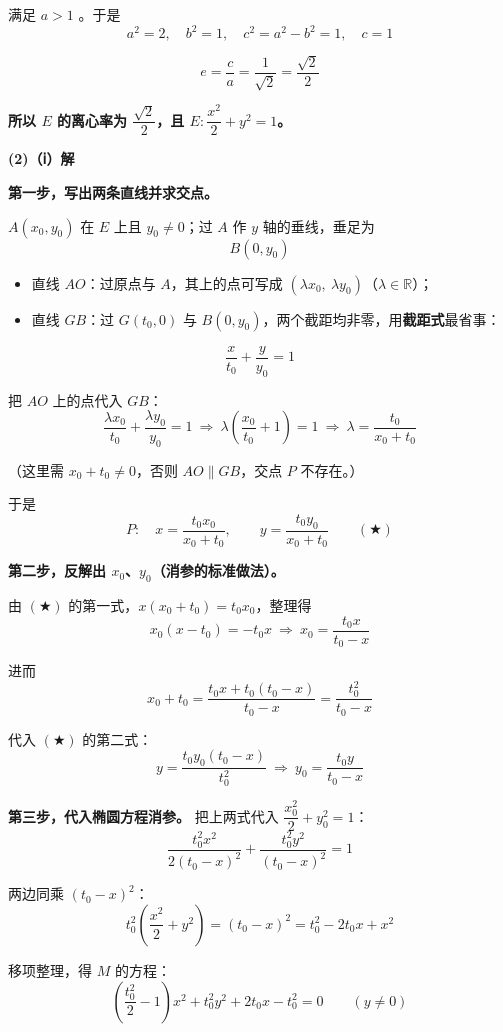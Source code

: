 满足 $a>1$ 。于是
\[a^2=2,\quad b^2=1,\quad c^2=a^2-b^2=1,\quad c=1\]

\[e=\frac{c}{a}=\frac{1}{\sqrt2}=\frac{\sqrt2}{2}\]

\textbf{所以 $E$ 的离心率为 $\dfrac{\sqrt2}{2}$，且 $E:\dfrac{x^2}{2}+y^2=1$。}

\par\medskip

\textbf{(2)（ⅰ）解}

\textbf{第一步，写出两条直线并求交点。}

$A(x_0,y_0)$ 在 $E$ 上且 $y_0\ne0$；过 $A$ 作 $y$ 轴的垂线，垂足为
\[B(0,y_0)\]

\begin{itemize}
\item 直线 $AO$：过原点与 $A$，其上的点可写成 $\left(\lambda x_0,\ \lambda y_0\right)$（$\lambda\in\mathbb{R}$）；
\item 直线 $GB$：过 $G(t_0,0)$ 与 $B(0,y_0)$，两个截距均非零，用\textbf{截距式}最省事：
\end{itemize}
\[\frac{x}{t_0}+\frac{y}{y_0}=1\]

把 $AO$ 上的点代入 $GB$：
\[\frac{\lambda x_0}{t_0}+\frac{\lambda y_0}{y_0}=1\ \Longrightarrow\ \lambda\left(\frac{x_0}{t_0}+1\right)=1\ \Longrightarrow\ \lambda=\frac{t_0}{x_0+t_0}\]

（这里需 $x_0+t_0\ne0$，否则 $AO\parallel GB$，交点 $P$ 不存在。）

于是
\[P:\quad x=\frac{t_0x_0}{x_0+t_0},\qquad y=\frac{t_0y_0}{x_0+t_0}\qquad(\bigstar)\]

\textbf{第二步，反解出 $x_0$、$y_0$（消参的标准做法）。}

由 $(\bigstar)$ 的第一式，$x\left(x_0+t_0\right)=t_0x_0$，整理得
\[x_0\left(x-t_0\right)=-t_0x\ \Longrightarrow\ x_0=\frac{t_0x}{t_0-x}\]

进而
\[x_0+t_0=\frac{t_0x+t_0\left(t_0-x\right)}{t_0-x}=\frac{t_0^2}{t_0-x}\]

代入 $(\bigstar)$ 的第二式：
\[y=\frac{t_0y_0\left(t_0-x\right)}{t_0^2}\ \Longrightarrow\ y_0=\frac{t_0y}{t_0-x}\]

\textbf{第三步，代入椭圆方程消参。} 把上两式代入 $\dfrac{x_0^2}{2}+y_0^2=1$：
\[\frac{t_0^2x^2}{2\left(t_0-x\right)^2}+\frac{t_0^2y^2}{\left(t_0-x\right)^2}=1\]

两边同乘 $\left(t_0-x\right)^2$：
\[t_0^2\left(\frac{x^2}{2}+y^2\right)=\left(t_0-x\right)^2=t_0^2-2t_0x+x^2\]

移项整理，得 $M$ 的方程：
\[\boxed{\left(\frac{t_0^2}{2}-1\right)x^2+t_0^2y^2+2t_0x-t_0^2=0\qquad(y\ne0)}\]

